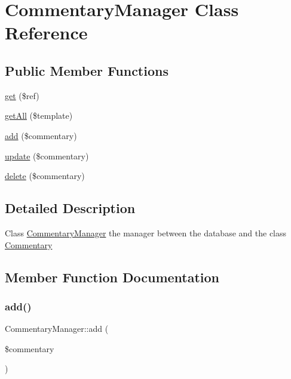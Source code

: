 \hypertarget{classCommentaryManager}{}\section{Commentary\+Manager Class Reference}
\label{classCommentaryManager}
\subsection*{Public Member Functions}
\begin{DoxyCompactItemize}
\item 
\hyperlink{classCommentaryManager_abfa8ac54b925b3c07dde9fa2cb465429}{get} (\$ref)
\item 
\hyperlink{classCommentaryManager_a7cd94e5d7649ec3f588c3d4588716db3}{get\+All} (\$template)
\item 
\hyperlink{classCommentaryManager_a758fab63a98799b34ef761a9d6ed6ee8}{add} (\$commentary)
\item 
\hyperlink{classCommentaryManager_ab39757f295cbb8c81ca71d4c221fd0cf}{update} (\$commentary)
\item 
\hyperlink{classCommentaryManager_a8c639e3a0de1af1f550388a0880d0cb8}{delete} (\$commentary)
\end{DoxyCompactItemize}


\subsection{Detailed Description}
Class \hyperlink{classCommentaryManager}{Commentary\+Manager} the manager between the database and the class \hyperlink{classCommentary}{Commentary} 

\subsection{Member Function Documentation}
\mbox{\label{classCommentaryManager_a758fab63a98799b34ef761a9d6ed6ee8}} 
\subsubsection{\texorpdfstring{add()}{add()}}
{\footnotesize\ttfamily Commentary\+Manager\+::add (\begin{DoxyParamCaption}\item[{}]{\$commentary }\end{DoxyParamCaption})}

